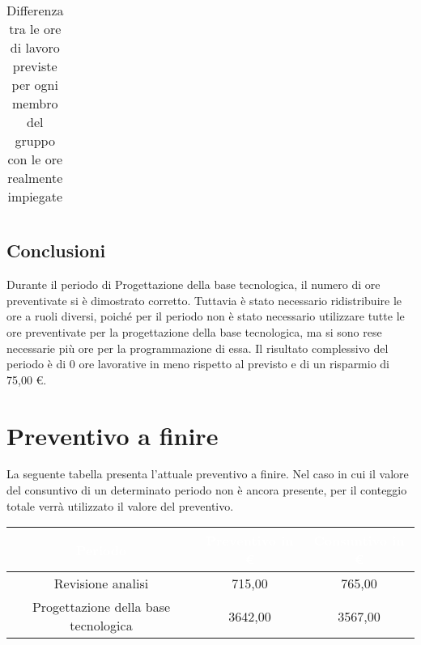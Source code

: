 \begin{flushleft}
\begin{table}[!h]
\begin{center}
\begin{tabularx}{\textwidth}{|c|cccccc|c|}
   	\end{tabularx}
  	\caption{Differenza tra le ore di lavoro previste per ogni membro del gruppo con le ore realmente impiegate }
\end{center}
\end{table}
  
  \subsection{Conclusioni}
  Durante il periodo di Progettazione della base tecnologica, il numero di ore preventivate si è dimostrato corretto. Tuttavia è stato necessario ridistribuire le ore a ruoli diversi, poiché per il periodo non è stato necessario utilizzare tutte le ore preventivate per la progettazione della base tecnologica, ma si sono rese necessarie più ore per la programmazione di essa. 
  Il risultato complessivo del periodo è di 0 ore lavorative in meno rispetto al previsto e di un risparmio di 75,00 \euro.
  
  \newpage

  \section{Preventivo a finire}
  La seguente tabella presenta l'attuale preventivo a finire. Nel caso in cui il valore del consuntivo di un determinato periodo non è ancora presente, per il conteggio totale verrà utilizzato il valore del preventivo.
  

  
	\begin{table}[!h]
  
	\begin{center}
  
  
		\begin{tabular}{ccc}
  
			\rowcolor{coolblack}
  
			\hline
  
			\textcolor{white}{Periodo} & \textcolor{white}{Preventivo in \euro} & \textcolor{white}{Consuntivo in \euro}\\
  
			\hline
  
			Revisione analisi   & 715,00	&  765,00  			 	\\ 
  
			Progettazione della base tecnologica &  3642,00 &  3567,00 \\ 
  

\end{tabular}
\end{center}
\end{table}
\end{flushleft}
